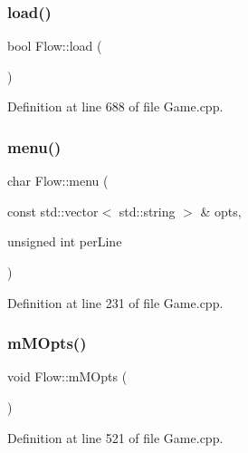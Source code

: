 \hypertarget{namespace_flow_a75ea47a1fbf09512d617570cce2eeb4e}{}\label{namespace_flow_a75ea47a1fbf09512d617570cce2eeb4e} 
\subsubsection{\texorpdfstring{load()}{load()}}
{\footnotesize\ttfamily bool Flow\+::load (\begin{DoxyParamCaption}{ }\end{DoxyParamCaption})}



Definition at line 688 of file Game.\+cpp.

\hypertarget{namespace_flow_aad435346322f19794b3bf501e15ada95}{}\label{namespace_flow_aad435346322f19794b3bf501e15ada95} 
\subsubsection{\texorpdfstring{menu()}{menu()}}
{\footnotesize\ttfamily char Flow\+::menu (\begin{DoxyParamCaption}\item[{const std\+::vector$<$ std\+::string $>$ \&}]{opts,  }\item[{unsigned int}]{per\+Line }\end{DoxyParamCaption})}



Definition at line 231 of file Game.\+cpp.

\hypertarget{namespace_flow_a0809d9a60d22a2867e9d3ffa2a7ab9bc}{}\label{namespace_flow_a0809d9a60d22a2867e9d3ffa2a7ab9bc} 
\subsubsection{\texorpdfstring{m\+M\+Opts()}{mMOpts()}}
{\footnotesize\ttfamily void Flow\+::m\+M\+Opts (\begin{DoxyParamCaption}{ }\end{DoxyParamCaption})}



Definition at line 521 of file Game.\+cpp.

\hypertarget{namespace_flow_a99dd7c10b5db12f296dc3a25313206da}{}\label{namespace_flow_a99dd7c10b5db12f296dc3a25313206da} 
